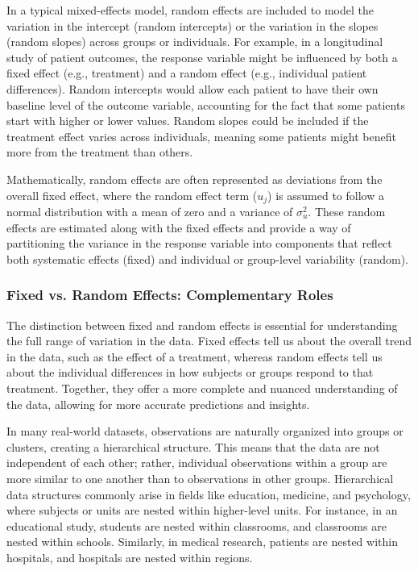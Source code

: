 In a typical mixed-effects model, random effects are included to model the variation in the intercept (random intercepts) or the variation in the slopes (random slopes) across groups or individuals. For example, in a longitudinal study of patient outcomes, the response variable might be influenced by both a fixed effect (e.g., treatment) and a random effect (e.g., individual patient differences). Random intercepts would allow each patient to have their own baseline level of the outcome variable, accounting for the fact that some patients start with higher or lower values. Random slopes could be included if the treatment effect varies across individuals, meaning some patients might benefit more from the treatment than others.

Mathematically, random effects are often represented as deviations from the overall fixed effect, where the random effect term ($u_j$) is assumed to follow a normal distribution with a mean of zero and a variance of $\sigma_u^2$. These random effects are estimated along with the fixed effects and provide a way of partitioning the variance in the response variable into components that reflect both systematic effects (fixed) and individual or group-level variability (random).

\subsubsection*{Fixed vs. Random Effects: Complementary Roles}
The distinction between fixed and random effects is essential for understanding the full range of variation in the data. Fixed effects tell us about the overall trend in the data, such as the effect of a treatment, whereas random effects tell us about the individual differences in how subjects or groups respond to that treatment. Together, they offer a more complete and nuanced understanding of the data, allowing for more accurate predictions and insights.

In many real-world datasets, observations are naturally organized into groups or clusters, creating a hierarchical structure. This means that the data are not independent of each other; rather, individual observations within a group are more similar to one another than to observations in other groups. Hierarchical data structures commonly arise in fields like education, medicine, and psychology, where subjects or units are nested within higher-level units. For instance, in an educational study, students are nested within classrooms, and classrooms are nested within schools. Similarly, in medical research, patients are nested within hospitals, and hospitals are nested within regions.

